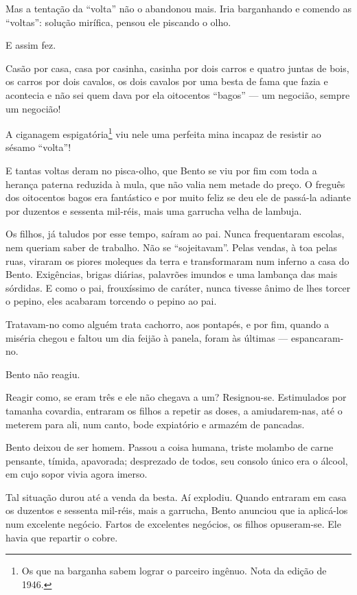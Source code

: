 Mas a tentação da ``volta'' não o abandonou mais. Iria barganhando e
comendo as ``voltas'': solução mirífica, pensou ele piscando o olho.

E assim fez.

Casão por casa, casa por casinha, casinha por dois carros e quatro
juntas de bois, os carros por dois cavalos, os dois cavalos por uma
besta de fama que fazia e acontecia e não sei quem dava por ela
oitocentos ``bagos'' --- um negocião, sempre um negocião!

A ciganagem espigatória\footnote{Os que na barganha sabem lograr o
  parceiro ingênuo. Nota da edição de 1946.} viu nele uma perfeita mina
incapaz de resistir ao sésamo ``volta''!

E tantas voltas deram no pisca-olho, que Bento se viu por fim com toda a
herança paterna reduzida à mula, que não valia nem metade do preço. O
freguês dos oitocentos bagos era fantástico e por muito feliz se deu ele
de passá-la adiante por duzentos e sessenta mil-réis, mais uma garrucha
velha de lambuja.

Os filhos, já taludos por esse tempo, saíram ao pai. Nunca frequentaram
escolas, nem queriam saber de trabalho. Não se ``sojeitavam''. Pelas
vendas, à toa pelas ruas, viraram os piores moleques da terra e
transformaram num inferno a casa do Bento. Exigências, brigas diárias,
palavrões imundos e uma lambança das mais sórdidas. E como o pai,
frouxíssimo de caráter, nunca tivesse ânimo de lhes torcer o pepino,
eles acabaram torcendo o pepino ao pai.

Tratavam-no como alguém trata cachorro, aos pontapés, e por fim, quando
a miséria chegou e faltou um dia feijão à panela, foram às últimas ---
espancaram-no.

Bento não reagiu.

Reagir como, se eram três e ele não chegava a um? Resignou-se.
Estimulados por tamanha covardia, entraram os filhos a repetir as doses,
a amiudarem-nas, até o meterem para ali, num canto, bode expiatório e
armazém de pancadas.

Bento deixou de ser homem. Passou a coisa humana, triste molambo de
carne pensante, tímida, apavorada; desprezado de todos, seu consolo
único era o álcool, em cujo sopor vivia agora imerso.

Tal situação durou até a venda da besta. Aí explodiu. Quando entraram em
casa os duzentos e sessenta mil-réis, mais a garrucha, Bento anunciou
que ia aplicá-los num excelente negócio. Fartos de excelentes negócios,
os filhos opuseram-se. Ele havia que repartir o cobre.

